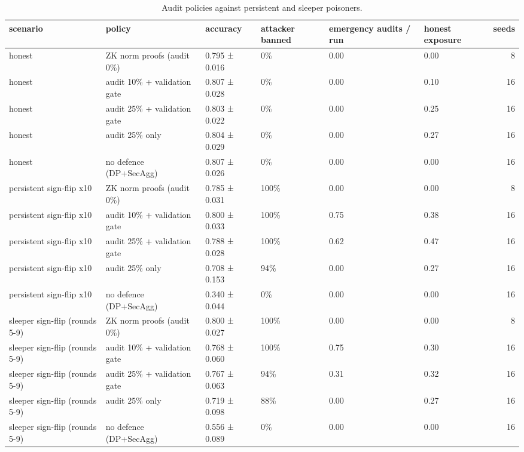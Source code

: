 \begin{table}
\caption{Audit policies against persistent and sleeper poisoners.}
\label{tab:T05_adaptive_defences}
\begin{tabular}{llllllr}
\toprule
scenario & policy & accuracy & attacker banned & emergency audits / run & honest exposure & seeds \\
\midrule
honest & ZK norm proofs (audit 0\%) & 0.795 ± 0.016 & 0\% & 0.00 & 0.00 & 8 \\
honest & audit 10\% + validation gate & 0.807 ± 0.028 & 0\% & 0.00 & 0.10 & 16 \\
honest & audit 25\% + validation gate & 0.803 ± 0.022 & 0\% & 0.00 & 0.25 & 16 \\
honest & audit 25\% only & 0.804 ± 0.029 & 0\% & 0.00 & 0.27 & 16 \\
honest & no defence (DP+SecAgg) & 0.807 ± 0.026 & 0\% & 0.00 & 0.00 & 16 \\
persistent sign-flip x10 & ZK norm proofs (audit 0\%) & 0.785 ± 0.031 & 100\% & 0.00 & 0.00 & 8 \\
persistent sign-flip x10 & audit 10\% + validation gate & 0.800 ± 0.033 & 100\% & 0.75 & 0.38 & 16 \\
persistent sign-flip x10 & audit 25\% + validation gate & 0.788 ± 0.028 & 100\% & 0.62 & 0.47 & 16 \\
persistent sign-flip x10 & audit 25\% only & 0.708 ± 0.153 & 94\% & 0.00 & 0.27 & 16 \\
persistent sign-flip x10 & no defence (DP+SecAgg) & 0.340 ± 0.044 & 0\% & 0.00 & 0.00 & 16 \\
sleeper sign-flip (rounds 5-9) & ZK norm proofs (audit 0\%) & 0.800 ± 0.027 & 100\% & 0.00 & 0.00 & 8 \\
sleeper sign-flip (rounds 5-9) & audit 10\% + validation gate & 0.768 ± 0.060 & 100\% & 0.75 & 0.30 & 16 \\
sleeper sign-flip (rounds 5-9) & audit 25\% + validation gate & 0.767 ± 0.063 & 94\% & 0.31 & 0.32 & 16 \\
sleeper sign-flip (rounds 5-9) & audit 25\% only & 0.719 ± 0.098 & 88\% & 0.00 & 0.27 & 16 \\
sleeper sign-flip (rounds 5-9) & no defence (DP+SecAgg) & 0.556 ± 0.089 & 0\% & 0.00 & 0.00 & 16 \\
\bottomrule
\end{tabular}
\end{table}
